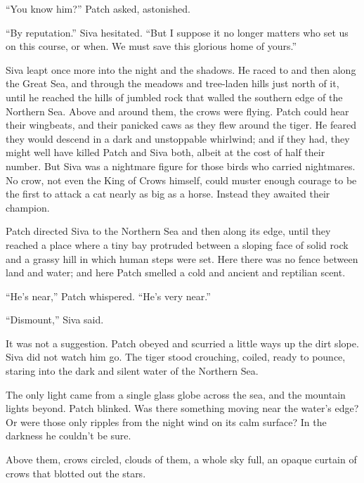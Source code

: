 \documentclass[ebook,oneside,openany,17pt]{memoir}
\newenvironment{tolerant}[1]{%
  \par\tolerance=#1\relax
}{%
  \par
}
\begin{document}
“You know him?” Patch asked, astonished.

“By reputation.” Siva hesitated. “But I suppose it no longer matters
who set us on this course, or when. We must save this glorious home of
yours.”

\begin{tolerant}{500}
Siva leapt once more into the night and the shadows. He raced to and
then along the Great Sea, and through the meadows and tree-laden hills
just north of it, until he reached the hills of jumbled rock that
walled the southern edge of the Northern Sea. Above and around them,
the crows were flying. Patch could hear their wingbeats, and their
panicked caws as they flew around the tiger. He feared they would
descend in a dark and unstoppable whirlwind; and if they had, they
might well have killed Patch and Siva both, albeit at the cost of half
their number. But Siva was a nightmare figure for those birds who
carried nightmares. No crow, not even the King of Crows himself, could
muster enough courage to be the first to attack a cat nearly as big as
a horse. Instead they awaited their champion.
\end{tolerant}

Patch directed Siva to the Northern Sea and then along its edge, until
they reached a place where a tiny bay protruded between a sloping face
of solid rock and a grassy hill in which human steps were set. Here
there was no fence between land and water; and here Patch smelled a
cold and ancient and reptilian scent.

“He’s near,” Patch whispered. “He’s very near.”

“Dismount,” Siva said.

It was not a suggestion. Patch obeyed and scurried a little ways up
the dirt slope. Siva did not watch him go. The tiger stood crouching,
coiled, ready to pounce, staring into the dark and silent water of the
Northern Sea.

\begin{tolerant}{1000}
The only light came from a single glass globe across the sea, and the
mountain lights beyond. Patch blinked. Was there something moving near
the water’s edge? Or were those only ripples from the night wind on
its calm surface? In the darkness he couldn’t be sure.
\end{tolerant}

\begin{tolerant}{1000}
Above them, crows circled, clouds of them, a whole sky full, an opaque
curtain of crows that blotted out the stars.
\end{tolerant}
\end{document}
